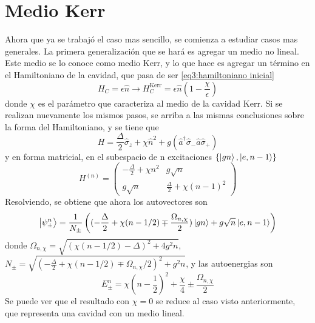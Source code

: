 \section{Medio Kerr}\label{sec3:medio kerr}
Ahora que ya se trabajó el caso mas sencillo, se comienza a estudiar casos mas generales. La primera generalización que se hará es agregar un medio no lineal. Este medio se lo conoce como medio Kerr, y lo que hace es agregar un término en el Hamiltoniano de la cavidad, que pasa de ser \ref{eq3:hamiltoniano inicial} 
\begin{equation}
    H_C=\epsilon \hat n \rightarrow H_C^{\text{Kerr}}=\epsilon \hat n (1-\frac{\chi}{\epsilon})
\end{equation}
donde $\chi$ es el parámetro que caracteriza al medio de la cavidad Kerr. Si se realizan nuevamente los mismos pasos, se arriba a las mismas conclusiones sobre la forma del Hamiltoniano, y se tiene que 
\begin{equation}
    H=\frac{\Delta}{2}\hat \sigma_z+\chi \hat n^2+g(\hat a^\dagger \hat \sigma_-\hat a \hat \sigma_+)
\end{equation}
y en forma matricial, en el subespacio de n excitaciones $\{\ket{gn},\ket{e,n-1}\}$
\begin{equation}
    H^{(n)} = \begin{pmatrix}
        -\frac{\Delta}{2}+\chi n^2 & g \sqrt{n} \\
        g \sqrt{n} & \frac{\Delta}{2}+\chi (n-1)^2 
    \end{pmatrix}
\end{equation}
Resolviendo, se obtiene que ahora los autovectores son
\begin{equation}
    \ket{\psi_\pm^n}=\frac{1}{N_\pm} \left( (-\frac{\Delta}{2}+\chi(n-1/2)\mp\frac{\Omega_{n,\chi}}{2}) \ket{gn} + g\sqrt{n} \ket{e,n-1}  \right)
\end{equation}
donde $\Omega_{n,\chi}=\sqrt{(\chi(n-1/2)-\Delta)^2+4g^2n}$, $N_\pm=\sqrt{(-\frac{\Delta}{2}+\chi(n-1/2)\mp\Omega_{n,\chi}/2)^2+g^2n}$, y las autoenergias son 
\begin{equation}\label{eq3:autoenergia kerr}
    E_\pm^n=\chi(n-\frac{1}{2})^2 +\frac{\chi}{4} \pm \frac{\Omega_{n,\chi}}{2}
\end{equation}
Se puede ver que el resultado con $\chi=0$ se reduce al caso visto anteriormente, que representa una cavidad con un medio lineal.

